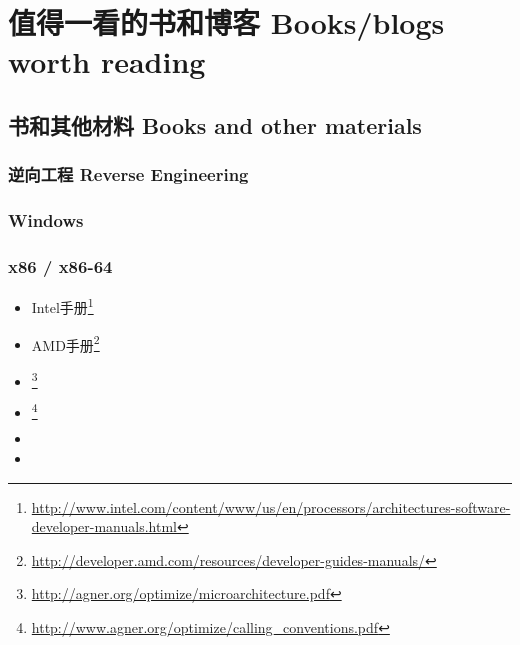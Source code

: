\documentclass[UTF8,nofonts]{ctexart}
\begin{document}

\chapter{值得一看的书和博客 Books/blogs worth reading}

\section{书和其他材料 Books and other materials}

\subsection{逆向工程 Reverse Engineering}



\subsection{Windows}



\subsection{\CCpp}



\subsection{x86 / x86-64}

\label{x86_manuals}
\begin{itemize}
\item Intel手册\footnote{\AlsoAvailableAs \url{http://www.intel.com/content/www/us/en/processors/architectures-software-developer-manuals.html}}

\item AMD手册\footnote{\AlsoAvailableAs \url{http://developer.amd.com/resources/developer-guides-manuals/}}

\item \AgnerFog{}\footnote{\AlsoAvailableAs \url{http://agner.org/optimize/microarchitecture.pdf}}

\item \AgnerFogCC{}\footnote{\AlsoAvailableAs \url{http://www.agner.org/optimize/calling_conventions.pdf}}

\item \IntelOptimization

\item \AMDOptimization
\end{itemize}
\end{document}
